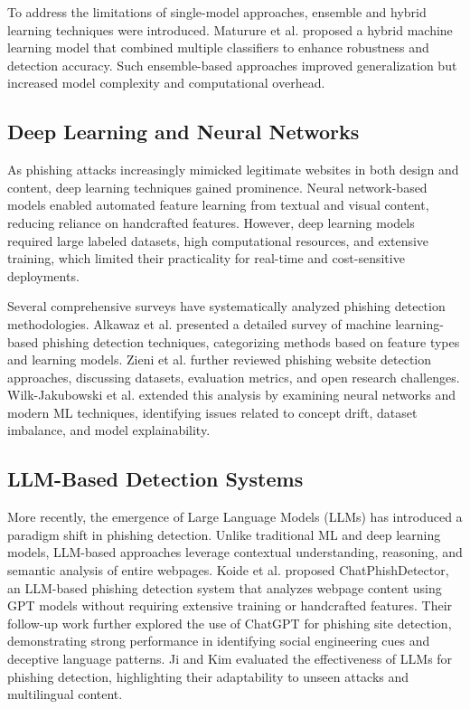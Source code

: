 \documentclass[conference]{IEEEtran}
\begin{document}
To address the limitations of single-model approaches, ensemble and hybrid learning techniques were introduced. Maturure et al. \cite{maturure2024hybrid} proposed a hybrid machine learning model that combined multiple classifiers to enhance robustness and detection accuracy. Such ensemble-based approaches improved generalization but increased model complexity and computational overhead.

\subsection{Deep Learning and Neural Networks}

As phishing attacks increasingly mimicked legitimate websites in both design and content, deep learning techniques gained prominence. Neural network-based models enabled automated feature learning from textual and visual content, reducing reliance on handcrafted features. However, deep learning models required large labeled datasets, high computational resources, and extensive training, which limited their practicality for real-time and cost-sensitive deployments.

Several comprehensive surveys have systematically analyzed phishing detection methodologies. Alkawaz et al. \cite{alkawaz2021comprehensive} presented a detailed survey of machine learning-based phishing detection techniques, categorizing methods based on feature types and learning models. Zieni et al. \cite{zieni2023phishing} further reviewed phishing website detection approaches, discussing datasets, evaluation metrics, and open research challenges. Wilk-Jakubowski et al. \cite{wilk2025machine} extended this analysis by examining neural networks and modern ML techniques, identifying issues related to concept drift, dataset imbalance, and model explainability.


\subsection{LLM-Based Detection Systems}

More recently, the emergence of Large Language Models (LLMs) has introduced a paradigm shift in phishing detection. Unlike traditional ML and deep learning models, LLM-based approaches leverage contextual understanding, reasoning, and semantic analysis of entire webpages. Koide et al. \cite{koide2024chatphish} proposed ChatPhishDetector, an LLM-based phishing detection system that analyzes webpage content using GPT models without requiring extensive training or handcrafted features. Their follow-up work \cite{koide2023detecting} further explored the use of ChatGPT for phishing site detection, demonstrating strong performance in identifying social engineering cues and deceptive language patterns. Ji and Kim \cite{ji2025effectively} evaluated the effectiveness of LLMs for phishing detection, highlighting their adaptability to unseen attacks and multilingual content.
\end{document}
